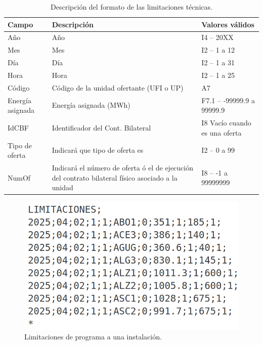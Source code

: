 \begin{table}[ht]
  \centering
  \begin{tabular}{|l|p{5cm}|l|}
    \hline
    Campo            & Descripción                                                                                       & Valores válidos               \\
    \hline
    Año              & Año                                                                                               & I4 -- 20XX                    \\
    Mes              & Mes                                                                                               & I2 -- 1 a 12                  \\
    Día              & Día                                                                                               & I2 -- 1 a 31                  \\
    Hora             & Hora                                                                                              & I2 -- 1 a 25                  \\
    Código           & Código de la unidad ofertante (UFI o UP)                                                          & A7                            \\
    Energía asignada & Energía asignada (MWh)                                                                            & F7.1 -- -99999.9 a 99999.9    \\
    IdCBF            & Identificador del Cont. Bilateral                                                                 & I8 Vacío cuando es una oferta \\
    Tipo de oferta   & Indicará que tipo de oferta es                                                                    & I2 -- 0 a 99                  \\
    NumOf            & Indicará el número de oferta ó el de ejecución del contrato bilateral físico asociado a la unidad & I8 -- -1 a 99999999           \\
    \hline
  \end{tabular}
  \caption[Descripción del formato de las limitaciones técnicas.]{Descripción del formato de las limitaciones técnicas.}
  \label{tab:descripción-limitaciones}
\end{table}

\begin{figure}
  \centering
  \includegraphics[width=0.5\linewidth]{figures/contenido-limitaciones.png}
  \caption[Limitaciones de programa a una instalación.]{Limitaciones de programa a una instalación.}
  \label{fig:contenido-limitaciones}
\end{figure}

